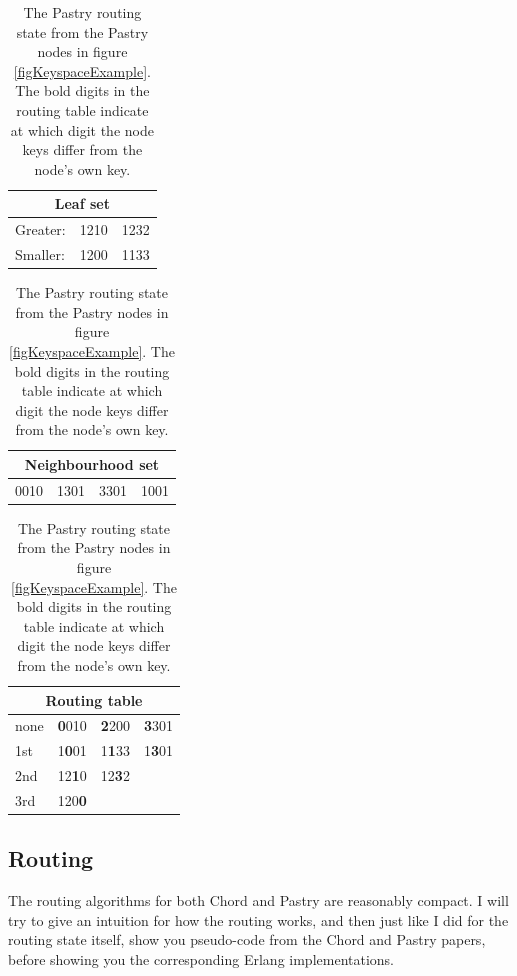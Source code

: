 \begin{table}[h]
\caption{The Pastry routing state from the Pastry nodes in figure \ref{figKeyspaceExample}. The bold digits in the routing table indicate at which digit the node keys differ from the node's own key.}
\begin{center}
\begin{tabular}{ | l | l | l | }
  \hline
  \multicolumn{3}{|c|}{Leaf set} \\ 
  \hline
  \hline                       
  Greater: & 1210 & 1232 \\
  \hline                       
  Smaller: & 1200 & 1133 \\
  \hline                       
\end{tabular}
\begin{tabular}{ | l | l | l | l | }
  \hline                       
  \multicolumn{4}{|c|}{Neighbourhood set} \\ 
  \hline
  \hline                       
  0010 & 1301 & 3301 & 1001 \\
  \hline                       
\end{tabular}
\begin{tabular}{ | l | l | l | l | }
  \hline                       
  \multicolumn{4}{|c|}{Routing table} \\ 
  \hline
  \hline                       
  \cellcolor{green} none & \textbf{0}010 & \textbf{2}200 & \textbf{3}301 \\
  \hline                       
  \cellcolor{green} 1st & 1\textbf{0}01 & 1\textbf{1}33 & 1\textbf{3}01 \\
  \hline                       
  \cellcolor{green} 2nd & 12\textbf{1}0 & 12\textbf{3}2 & \\
  \hline                       
  \cellcolor{green} 3rd & 120\textbf{0} & & \\
  \hline                       
\end{tabular}
\end{center}
\label{tablePastryRoutingTable}
\end{table}

\subsection{Routing}
The routing algorithms for both Chord and Pastry are reasonably compact. I will try to give an intuition for how the routing works, and then just like I did for the routing state itself, show you pseudo-code from the Chord \cite{chord} and Pastry \cite{pastry} papers, before showing you the corresponding Erlang implementations.

